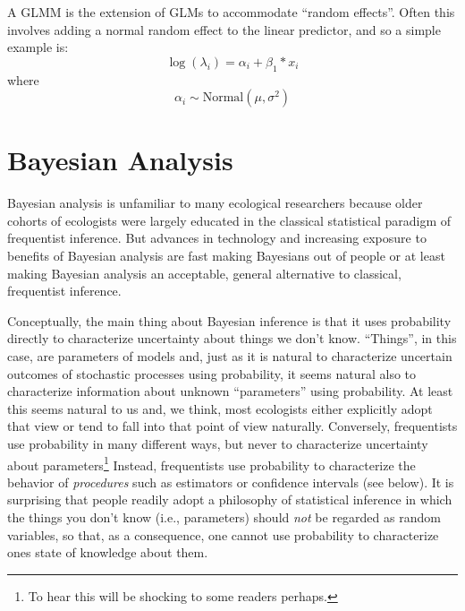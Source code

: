 A GLMM is the extension of GLMs to accommodate ``random
effects''. Often this involves adding a normal random effect to the
linear predictor, and so a simple example is:
\[
 \log(\lambda_{i}) = \alpha_{i} + \beta_{1}*x_{i}
\]
where
\[
 \alpha_{i} \sim \mbox{Normal}(\mu,\sigma^{2})
\]



\section{Bayesian Analysis}

Bayesian analysis is unfamiliar to many ecological researchers because
older cohorts of ecologists were largely educated in the classical
statistical paradigm of frequentist inference. But advances in
technology and increasing exposure to benefits of Bayesian analysis
are fast making Bayesians out of people or at least making Bayesian
analysis an acceptable, general alternative to classical, frequentist
inference.

Conceptually, the main thing about Bayesian inference is that it uses
probability directly to characterize uncertainty about things we don't
know.  ``Things'', in this case, are parameters of models and, just as
it is natural to characterize uncertain outcomes of stochastic
processes using probability, it seems natural also to characterize
information about unknown ``parameters'' using probability. At least
this seems natural to us and, we think, most ecologists either
explicitly adopt that view or tend to fall into that point of view
naturally.  Conversely, frequentists use probability in many different
ways, but never to characterize uncertainty about
parameters\footnote{To hear this will be shocking to some readers
  perhaps.} Instead, frequentists use probability to characterize the
behavior of {\it procedures} such as estimators or confidence
intervals (see below). It is surprising that people readily
adopt a philosophy of statistical inference in which the things you
don't know (i.e., parameters) should {\it not} be regarded as random
variables, so that, as a consequence, one cannot use probability to
characterize ones state of knowledge about them.


